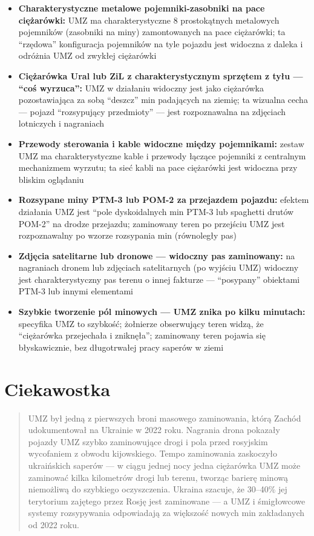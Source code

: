 \documentclass[12pt,openany,oneside]{book}
\providecommand{\tightlist}{%
  \setlength{\itemsep}{0pt}\setlength{\parskip}{0pt}}
\begin{document}
\begin{itemize}
\tightlist
\item
  \textbf{Charakterystyczne metalowe pojemniki-zasobniki na pace
  ciężarówki:} UMZ ma charakterystyczne 8 prostokątnych metalowych
  pojemników (zasobniki na miny) zamontowanych na pace ciężarówki; ta
  ``rzędowa'' konfiguracja pojemników na tyle pojazdu jest widoczna z
  daleka i odróżnia UMZ od zwykłej ciężarówki
\item
  \textbf{Ciężarówka Ural lub ZiL z charakterystycznym sprzętem z tyłu
  --- ``coś wyrzuca'':} UMZ w działaniu widoczny jest jako ciężarówka
  pozostawiająca za sobą ``deszcz'' min padających na ziemię; ta
  wizualna cecha --- pojazd ``rozsypujący przedmioty'' --- jest
  rozpoznawalna na zdjęciach lotniczych i nagraniach
\item
  \textbf{Przewody sterowania i kable widoczne między pojemnikami:}
  zestaw UMZ ma charakterystyczne kable i przewody łączące pojemniki z
  centralnym mechanizmem wyrzutu; ta sieć kabli na pace ciężarówki jest
  widoczna przy bliskim oglądaniu
\item
  \textbf{Rozsypane miny PTM-3 lub POM-2 za przejazdem pojazdu:} efektem
  działania UMZ jest ``pole dyskoidalnych min PTM-3 lub spaghetti drutów
  POM-2'' na drodze przejazdu; zaminowany teren po przejściu UMZ jest
  rozpoznawalny po wzorze rozsypania min (równoległy pas)
\item
  \textbf{Zdjęcia satelitarne lub dronowe --- widoczny pas zaminowany:}
  na nagraniach dronem lub zdjęciach satelitarnych (po wyjściu UMZ)
  widoczny jest charakterystyczny pas terenu o innej fakturze ---
  ``posypany'' obiektami PTM-3 lub innymi elementami
\item
  \textbf{Szybkie tworzenie pól minowych --- UMZ znika po kilku
  minutach:} specyfika UMZ to szybkość; żołnierze obserwujący teren
  widzą, że ``ciężarówka przejechała i zniknęła''; zaminowany teren
  pojawia się błyskawicznie, bez długotrwałej pracy saperów w ziemi
\end{itemize}

\section{Ciekawostka}\label{ciekawostka-118}

\begin{quote}
UMZ był jedną z pierwszych broni masowego zaminowania, którą Zachód
udokumentował na Ukrainie w 2022 roku. Nagrania drona pokazały pojazdy
UMZ szybko zaminowujące drogi i pola przed rosyjskim wycofaniem z obwodu
kijowskiego. Tempo zaminowania zaskoczyło ukraińskich saperów --- w
ciągu jednej nocy jedna ciężarówka UMZ może zaminować kilka kilometrów
drogi lub terenu, tworząc barierę minową niemożliwą do szybkiego
oczyszczenia. Ukraina szacuje, że 30--40\% jej terytorium zajętego przez
Rosję jest zaminowane --- a UMZ i śmigłowcowe systemy rozsypywania
odpowiadają za większość nowych min zakładanych od 2022 roku.
\end{quote}
\end{document}
